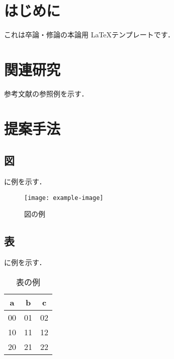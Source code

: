 \documentclass[dvipdfmx]{thesis}
\begin{document}
\makethesistitle[
type={卒業論文},
organization={鳥取大学},
division={工学部電気情報系学科},
title={論文のタイトル\\サブタイトル},
studentnumber={B99T9999Z},
author={鳥取 太郎},
date={令和6年2月},
]
\maketableofcontents
\chapter{はじめに}
これは卒論・修論の本論用 \LaTeX テンプレートです．
\chapter{関連研究}
参考文献の参照例を示す\cite{Article:2024:Toridai}．
\chapter{提案手法}
\section{図}
に例を示す．

\begin{figure}[h]
  \centering
  \texttt{[image: example-image]}
  \caption{図の例}
  \label{fig:example-image-1}
\end{figure}

\section{表}
に例を示す．

\begin{table}[h]
  \centering
  \caption{表の例}
  \begin{tabular}{|c c c|}
    a & b & c \\
    \hline
    00 & 01 & 02 \\ 
    10 & 11 & 12 \\ 
    20 & 21 & 22 \\ 
  \end{tabular}
  \label{tab:example-example}
\end{table}
\end{document}
